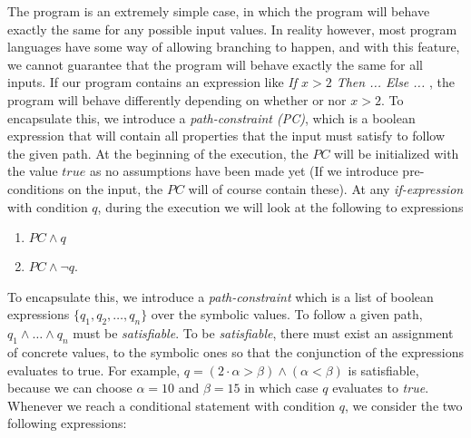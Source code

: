 			
		 The program is an extremely simple case, in which the program will behave exactly the same for any possible input values. In reality however, most program languages have some way of allowing branching to happen, and with this feature, we cannot guarantee that the program will behave exactly the same for all inputs. If our program contains an expression like \emph{If $x > 2$ Then ... Else ... }, the program will behave differently depending on whether or nor $x > 2$. To encapsulate this, we introduce a \emph{path-constraint (PC)}, which is a boolean expression that will contain all properties that the input must satisfy to follow the given path. At the beginning of the execution, the $PC$ will be initialized with the value $true$ as no assumptions have been made yet (If we introduce pre-conditions on the input, the $PC$ will of course contain these). 
		At any \emph{if-expression} with condition $q$, during the execution we will look at the following to expressions
		
		\begin{enumerate}
			\item $ PC \land q$
			\item $ PC \land \neg q$.
		\end{enumerate}
		
		To encapsulate this, we introduce a \emph{path-constraint} which is a list of boolean expressions $\{q_1, q_2, \ldots, q_n \}$ over the symbolic values. To follow a given path, $q_1 \land \ldots \land q_n$ must be \emph{satisfiable}. To be \emph{satisfiable}, there must exist an assignment of concrete values, to the symbolic ones so that the conjunction of the expressions evaluates to true. For example, $q = (2\cdot \alpha > \beta) \land (\alpha < \beta)$ is satisfiable, because we can choose $\alpha = 10$ and $\beta = 15$ in which case $q$ evaluates to \emph{true}.
		\\ 
		Whenever we reach a conditional statement with condition $q$, we consider the two following expressions:
		

